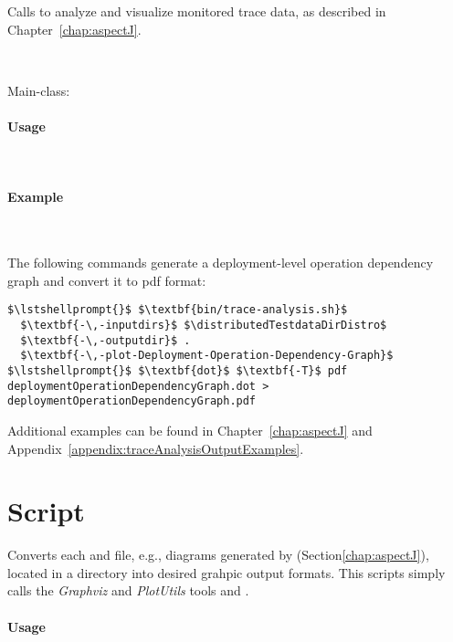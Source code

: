 Calls \KiekerTraceAnalysis{} to analyze and visualize monitored trace data, %
as described in Chapter~\ref{chap:aspectJ}.

\

\noindent Main-class: {\small {}}

\pagebreak

\paragraph*{Usage}\

\setTextListing


\paragraph*{Example}\

\noindent The following commands generate a deployment-level operation dependency 
graph and convert it to pdf format:

\enlargethispage{1cm}

\setTextListing
\begin{lstlisting}
$\lstshellprompt{}$ $\textbf{bin/trace-analysis.sh}$
  $\textbf{-\,-inputdirs}$ $\distributedTestdataDirDistro$ 
  $\textbf{-\,-outputdir}$ . 
  $\textbf{-\,-plot-Deployment-Operation-Dependency-Graph}$
$\lstshellprompt{}$ $\textbf{dot}$ $\textbf{-T}$ pdf  deploymentOperationDependencyGraph.dot > deploymentOperationDependencyGraph.pdf
\end{lstlisting}

\noindent Additional examples can be found in Chapter~\ref{chap:aspectJ} and %
Appendix~\ref{appendix:traceAnalysisOutputExamples}.

\section{Script }

Converts each  and  file, e.g., diagrams generated by %
\KiekerTraceAnalysis{} (Section\ref{chap:aspectJ}), located in a directory %
into desired grahpic output formats. %
This scripts simply calls the \textit{Graphviz} and \textit{PlotUtils} tools  and .

\paragraph*{Usage}\

